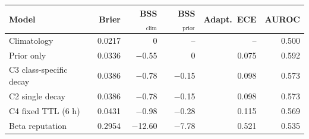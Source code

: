 \begin{tabular}{lrrrrr}
\toprule
Model & Brier & BSS$_{\text{clim}}$ & BSS$_{\text{prior}}$ & Adapt.\ ECE & AUROC\\
\midrule
Climatology & 0.0217 & 0 & -- & -- & 0.500\\
Prior only & 0.0336 & $-$0.55 & 0 & 0.075 & 0.592\\
C3 class-specific decay & 0.0386 & $-$0.78 & $-$0.15 & 0.098 & 0.573\\
C2 single decay & 0.0386 & $-$0.78 & $-$0.15 & 0.098 & 0.573\\
C4 fixed TTL (6 h) & 0.0431 & $-$0.98 & $-$0.28 & 0.115 & 0.569\\
Beta reputation~\cite{josang2002beta} & 0.2954 & $-$12.60 & $-$7.78 & 0.521 & 0.535\\
\bottomrule
\end{tabular}
